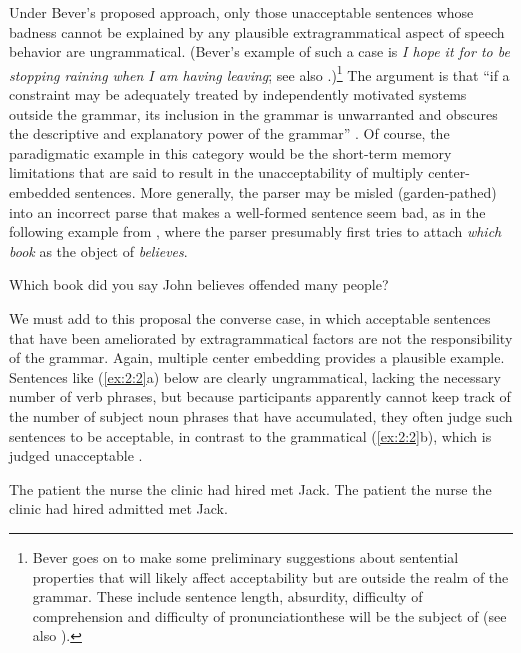 Under Bever's proposed approach, only those unacceptable sentences whose badness cannot be explained by any plausible extragrammatical aspect of speech behavior are ungrammatical. (Bever's example of such a case is \textit{I hope it for to be stopping raining when I am having leaving}; see also \citet{Bever1971}.)\footnote{Bever goes on to make some preliminary suggestions about sentential properties that will likely affect acceptability but are outside the realm of the grammar. These include sentence length, absurdity, difficulty of comprehension and difficulty of pronunciation\schdash{}these will be the subject of  (see also \citealt{KatzEtAl1976}).}
 The argument is that ``if a constraint may be adequately treated by independently motivated systems outside the grammar, its inclusion in the grammar is unwarranted and obscures the descriptive and explanatory power of the grammar'' \citep[150]{BeverEtAl1976a}. Of course, the paradigmatic example in this category would be the short-term memory limitations that are said to result in the unacceptability of multiply center-embedded sentences. More generally, the parser may be misled (garden-pathed) into an incorrect parse that makes a well-formed sentence seem bad, as in the following example from \citet{Ellis1991}, where the
parser presumably first tries to attach \textit{which book} as the object of \textit{believes}.

\ea \label{ex:2:1}
    Which book did you say John believes offended many people?
\z

	   

We must add to this proposal the converse case, in which acceptable sentences that have been ameliorated by extragrammatical factors are not the responsibility of the grammar. Again, multiple center embedding provides a plausible example. Sentences like (\ref{ex:2:2}a) below are clearly ungrammatical, lacking the necessary number of verb phrases, but because participants apparently cannot keep track of the number of subject noun phrases that have accumulated, they often judge such sentences to be acceptable, in contrast to the grammatical (\ref{ex:2:2}b), which is judged unacceptable \citep{Frazier1985}.

\ea \label{ex:2:2}
\ea
The patient the nurse the clinic had hired met Jack.
\ex
The patient the nurse the clinic had hired admitted met Jack.
\z
\z

